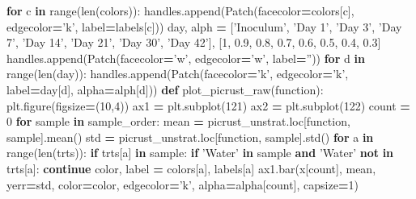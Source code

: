\documentclass[
]{article}
\newenvironment{Shaded}{\begin{snugshade}}{\end{snugshade}}
\newcommand{\BuiltInTok}[1]{#1}
\newcommand{\ControlFlowTok}[1]{\textcolor[rgb]{0.13,0.29,0.53}{\textbf{#1}}}
\newcommand{\DecValTok}[1]{\textcolor[rgb]{0.00,0.00,0.81}{#1}}
\newcommand{\FloatTok}[1]{\textcolor[rgb]{0.00,0.00,0.81}{#1}}
\newcommand{\KeywordTok}[1]{\textcolor[rgb]{0.13,0.29,0.53}{\textbf{#1}}}
\newcommand{\NormalTok}[1]{#1}
\newcommand{\OperatorTok}[1]{\textcolor[rgb]{0.81,0.36,0.00}{\textbf{#1}}}
\newcommand{\StringTok}[1]{\textcolor[rgb]{0.31,0.60,0.02}{#1}}
\begin{document}
\begin{Shaded}
\begin{Highlighting}[]
\ControlFlowTok{for}\NormalTok{ c }\KeywordTok{in} \BuiltInTok{range}\NormalTok{(}\BuiltInTok{len}\NormalTok{(colors)):}
\NormalTok{  handles.append(Patch(facecolor}\OperatorTok{=}\NormalTok{colors[c], edgecolor}\OperatorTok{=}\StringTok{'k'}\NormalTok{, label}\OperatorTok{=}\NormalTok{labels[c]))}
\NormalTok{day, alph }\OperatorTok{=}\NormalTok{ [}\StringTok{'Inoculum'}\NormalTok{, }\StringTok{'Day 1'}\NormalTok{, }\StringTok{'Day 3'}\NormalTok{, }\StringTok{'Day 7'}\NormalTok{, }\StringTok{'Day 14'}\NormalTok{, }\StringTok{'Day 21'}\NormalTok{, }\StringTok{'Day 30'}\NormalTok{, }\StringTok{'Day 42'}\NormalTok{], [}\DecValTok{1}\NormalTok{, }\FloatTok{0.9}\NormalTok{, }\FloatTok{0.8}\NormalTok{, }\FloatTok{0.7}\NormalTok{, }\FloatTok{0.6}\NormalTok{, }\FloatTok{0.5}\NormalTok{, }\FloatTok{0.4}\NormalTok{, }\FloatTok{0.3}\NormalTok{]}
\NormalTok{handles.append(Patch(facecolor}\OperatorTok{=}\StringTok{'w'}\NormalTok{, edgecolor}\OperatorTok{=}\StringTok{'w'}\NormalTok{, label}\OperatorTok{=}\StringTok{''}\NormalTok{))}
\ControlFlowTok{for}\NormalTok{ d }\KeywordTok{in} \BuiltInTok{range}\NormalTok{(}\BuiltInTok{len}\NormalTok{(day)):}
\NormalTok{  handles.append(Patch(facecolor}\OperatorTok{=}\StringTok{'k'}\NormalTok{, edgecolor}\OperatorTok{=}\StringTok{'k'}\NormalTok{, label}\OperatorTok{=}\NormalTok{day[d], alpha}\OperatorTok{=}\NormalTok{alph[d]))}
\KeywordTok{def}\NormalTok{ plot_picrust_raw(function):}
\NormalTok{  plt.figure(figsize}\OperatorTok{=}\NormalTok{(}\DecValTok{10}\NormalTok{,}\DecValTok{4}\NormalTok{))}
\NormalTok{  ax1 }\OperatorTok{=}\NormalTok{ plt.subplot(}\DecValTok{121}\NormalTok{)}
\NormalTok{  ax2 }\OperatorTok{=}\NormalTok{ plt.subplot(}\DecValTok{122}\NormalTok{)}
\NormalTok{  count }\OperatorTok{=} \DecValTok{0}
  \ControlFlowTok{for}\NormalTok{ sample }\KeywordTok{in}\NormalTok{ sample_order:}
\NormalTok{    mean }\OperatorTok{=}\NormalTok{ picrust_unstrat.loc[function, sample].mean()}
\NormalTok{    std }\OperatorTok{=}\NormalTok{ picrust_unstrat.loc[function, sample].std()}
    \ControlFlowTok{for}\NormalTok{ a }\KeywordTok{in} \BuiltInTok{range}\NormalTok{(}\BuiltInTok{len}\NormalTok{(trts)):}
      \ControlFlowTok{if}\NormalTok{ trts[a] }\KeywordTok{in}\NormalTok{ sample:}
        \ControlFlowTok{if} \StringTok{'Water'} \KeywordTok{in}\NormalTok{ sample }\KeywordTok{and} \StringTok{'Water'} \KeywordTok{not} \KeywordTok{in}\NormalTok{ trts[a]:}
          \ControlFlowTok{continue}
\NormalTok{        color, label }\OperatorTok{=}\NormalTok{ colors[a], labels[a]}
\NormalTok{    ax1.bar(x[count], mean, yerr}\OperatorTok{=}\NormalTok{std, color}\OperatorTok{=}\NormalTok{color, edgecolor}\OperatorTok{=}\StringTok{'k'}\NormalTok{, alpha}\OperatorTok{=}\NormalTok{alpha[count], capsize}\OperatorTok{=}\DecValTok{1}\NormalTok{)}

\end{Highlighting}
\end{Shaded}
\end{document}
